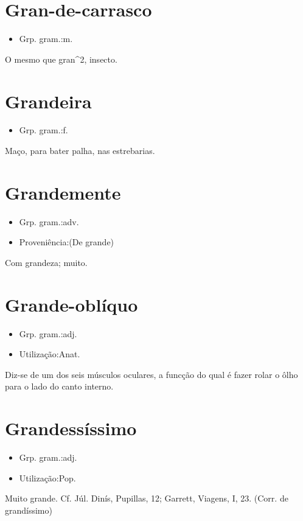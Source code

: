 \section{Gran-de-carrasco}
\begin{itemize}
\item {Grp. gram.:m.}
\end{itemize}
O mesmo que \textunderscore gran\textunderscore ^2, insecto.
\section{Grandeira}
\begin{itemize}
\item {Grp. gram.:f.}
\end{itemize}
Maço, para bater palha, nas estrebarias.
\section{Grandemente}
\begin{itemize}
\item {Grp. gram.:adv.}
\end{itemize}
\begin{itemize}
\item {Proveniência:(De \textunderscore grande\textunderscore )}
\end{itemize}
Com grandeza; muito.
\section{Grande-oblíquo}
\begin{itemize}
\item {Grp. gram.:adj.}
\end{itemize}
\begin{itemize}
\item {Utilização:Anat.}
\end{itemize}
Diz-se de um dos seis músculos oculares, a funcção do qual é fazer rolar o ôlho para o lado do canto interno.
\section{Grandessíssimo}
\begin{itemize}
\item {Grp. gram.:adj.}
\end{itemize}
\begin{itemize}
\item {Utilização:Pop.}
\end{itemize}
Muito grande. Cf. Júl. Dinís, \textunderscore Pupillas\textunderscore , 12; Garrett, \textunderscore Viagens\textunderscore , I, 23.
(Corr. de \textunderscore grandíssimo\textunderscore )
